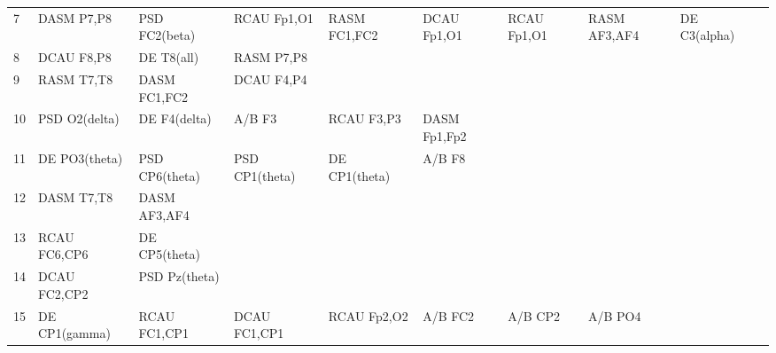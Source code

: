 \begin{landscape}
\begin{table}[]
\begin{tabular}{l|llllllll}
7        & DASM P7,P8            & PSD FC2(beta)         & RCAU Fp1,O1          & RASM FC1,FC2            & DCAU Fp1,O1             & RCAU Fp1,O1          & RASM AF3,AF4         & DE C3(alpha)          &                       &                    \\
8        & DCAU F8,P8            & DE T8(all)            & RASM P7,P8           &                         &                         &                      &                      &                       &                       &                    \\
9        & RASM T7,T8            & DASM FC1,FC2          & DCAU F4,P4           &                         &                         &                      &                      &                       &                       &                    \\
10       & PSD O2(delta)         & DE F4(delta)          & A/B F3               & RCAU F3,P3              & DASM Fp1,Fp2            &                      &                      &                       &                       &                    \\
11       & DE PO3(theta)         & PSD CP6(theta)        & PSD CP1(theta)       & DE CP1(theta)           & A/B F8                  &                      &                      &                       &                       &                    \\
12       & DASM T7,T8            & DASM AF3,AF4          &                      &                         &                         &                      &                      &                       &                       &                    \\
13       & RCAU FC6,CP6          & DE CP5(theta)         &                      &                         &                         &                      &                      &                       &                       &                    \\
14       & DCAU FC2,CP2          & PSD Pz(theta)         &                      &                         &                         &                      &                      &                       &                       &                    \\
15       & DE CP1(gamma)         & RCAU FC1,CP1          & DCAU FC1,CP1         & RCAU Fp2,O2             & A/B FC2                 & A/B CP2              & A/B PO4              &                       &                       &                    \\

\end{tabular}
\end{table}
\end{landscape}

